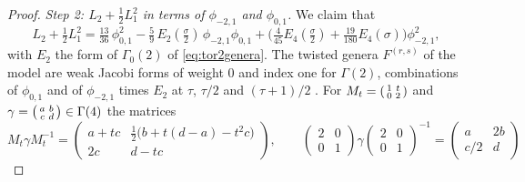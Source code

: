 \begin{proof}
\emph{Step 2: $L_2+\frac12L_1^2$ in terms of $\phi_{-2,1}$ and $\phi_{0,1}$.} We claim that
\begin{equation}\label{eq:chlunitG1}
L_2+\tfrac12L_1^2=\tfrac{13}{36}\,\phi_{0,1}^2-\tfrac59\,E_2(\tfrac\sigma2)\,\phi_{-2,1}\phi_{0,1}+\Big(\tfrac4{45}E_4(\tfrac\sigma2)+\tfrac{19}{180}E_4(\sigma)\Big)\phi_{-2,1}^2,
\end{equation}
with $E_2$ the form of $\Gamma_0(2)$ of \eqref{eq:tor2genera}. The twisted genera $F^{(r,s)}$ of the model are weak Jacobi forms of weight $0$ and index one for $\Gamma(2)$, combinations of $\phi_{0,1}$ and of $\phi_{-2,1}$ times $E_2$ at $\tau$, $\tau/2$ and $(\tau+1)/2$ \cite{DJS06}. For $M_t=\begin{psmallmatrix}1&t\\0&2\end{psmallmatrix}$ and $\gamma=\begin{psmallmatrix}a&b\\c&d\end{psmallmatrix}\in\Gamma(4)$ the matrices
\[
M_t\gamma M_t^{-1}=\begin{pmatrix}a+tc&\tfrac12\big(b+t(d-a)-t^2c\big)\\2c&d-tc\end{pmatrix},\qquad
\begin{pmatrix}2&0\\0&1\end{pmatrix}\gamma\begin{pmatrix}2&0\\0&1\end{pmatrix}^{-1}=\begin{pmatrix}a&2b\\c/2&d\end{pmatrix}
\]

\end{proof}
